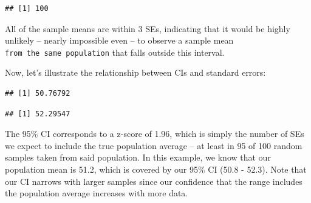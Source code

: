 \documentclass[]{book}
\newenvironment{Shaded}{\begin{snugshade}}{\end{snugshade}}
\newcommand{\CommentTok}[1]{\textcolor[rgb]{0.56,0.35,0.01}{\textit{#1}}}
\newcommand{\FloatTok}[1]{\textcolor[rgb]{0.00,0.00,0.81}{#1}}
\newcommand{\KeywordTok}[1]{\textcolor[rgb]{0.13,0.29,0.53}{\textbf{#1}}}
\newcommand{\NormalTok}[1]{#1}
\newcommand{\OperatorTok}[1]{\textcolor[rgb]{0.81,0.36,0.00}{\textbf{#1}}}
\newcommand{\StringTok}[1]{\textcolor[rgb]{0.31,0.60,0.02}{#1}}
\begin{document}
\begin{verbatim}
## [1] 100
\end{verbatim}

All of the sample means are within 3 SEs, indicating that it would be highly unlikely -- nearly impossible even -- to observe a sample mean \texttt{from\ the\ same\ population} that falls outside this interval.

Now, let's illustrate the relationship between CIs and standard errors:

\begin{Shaded}
\end{Shaded}

\begin{Shaded}
\end{Shaded}

\begin{verbatim}
## [1] 50.76792
\end{verbatim}

\begin{Shaded}
\end{Shaded}

\begin{verbatim}
## [1] 52.29547
\end{verbatim}

The 95\% CI corresponds to a z-score of 1.96, which is simply the number of SEs we expect to include the true population average -- at least in 95 of 100 random samples taken from said population. In this example, we know that our population mean is 51.2, which is covered by our 95\% CI (50.8 - 52.3). Note that our CI narrows with larger samples since our confidence that the range includes the population average increases with more data.
\end{document}
